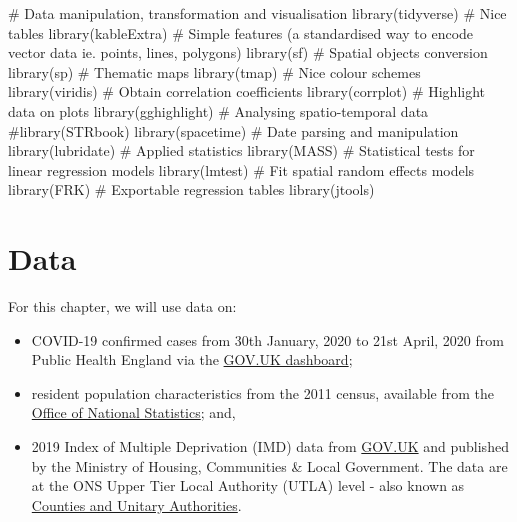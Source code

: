 \documentclass[
  letterpaper,
  krantz2]{style/krantz}
\newenvironment{Shaded}{\begin{snugshade}}{\end{snugshade}}
\newcommand{\CommentTok}[1]{\textcolor[rgb]{0.37,0.37,0.37}{#1}}
\newcommand{\FunctionTok}[1]{\textcolor[rgb]{0.28,0.35,0.67}{#1}}
\newcommand{\NormalTok}[1]{\textcolor[rgb]{0.00,0.23,0.31}{#1}}
\begin{document}
\begin{Shaded}
\begin{Highlighting}[]
\CommentTok{\# Data manipulation, transformation and visualisation}
\FunctionTok{library}\NormalTok{(tidyverse)}
\CommentTok{\# Nice tables}
\FunctionTok{library}\NormalTok{(kableExtra)}
\CommentTok{\# Simple features (a standardised way to encode vector data ie. points, lines, polygons)}
\FunctionTok{library}\NormalTok{(sf) }
\CommentTok{\# Spatial objects conversion}
\FunctionTok{library}\NormalTok{(sp) }
\CommentTok{\# Thematic maps}
\FunctionTok{library}\NormalTok{(tmap) }
\CommentTok{\# Nice colour schemes}
\FunctionTok{library}\NormalTok{(viridis) }
\CommentTok{\# Obtain correlation coefficients}
\FunctionTok{library}\NormalTok{(corrplot)}
\CommentTok{\# Highlight data on plots}
\FunctionTok{library}\NormalTok{(gghighlight)}
\CommentTok{\# Analysing spatio{-}temporal data}
\CommentTok{\#library(STRbook)}
\FunctionTok{library}\NormalTok{(spacetime)}
\CommentTok{\# Date parsing and manipulation}
\FunctionTok{library}\NormalTok{(lubridate)}
\CommentTok{\# Applied statistics}
\FunctionTok{library}\NormalTok{(MASS)}
\CommentTok{\# Statistical tests for linear regression models}
\FunctionTok{library}\NormalTok{(lmtest)}
\CommentTok{\# Fit spatial random effects models}
\FunctionTok{library}\NormalTok{(FRK)}
\CommentTok{\# Exportable regression tables}
\FunctionTok{library}\NormalTok{(jtools)}
\end{Highlighting}
\end{Shaded}

\hypertarget{data-7}{%
\section{Data}\label{data-7}}

For this chapter, we will use data on:

\begin{itemize}
\item
  COVID-19 confirmed cases from 30th January, 2020 to 21st April, 2020
  from Public Health England via the
  \href{https://coronavirus.data.gov.uk}{GOV.UK dashboard};
\item
  resident population characteristics from the 2011 census, available
  from the \href{https://www.nomisweb.co.uk/home/census2001.asp}{Office
  of National Statistics}; and,
\item
  2019 Index of Multiple Deprivation (IMD) data from
  \href{https://www.gov.uk/government/statistics/english-indices-of-deprivation-2019}{GOV.UK}
  and published by the Ministry of Housing, Communities \& Local
  Government. The data are at the ONS Upper Tier Local Authority (UTLA)
  level - also known as
  \href{https://geoportal.statistics.gov.uk}{Counties and Unitary
  Authorities}.
\end{itemize}
\end{document}
